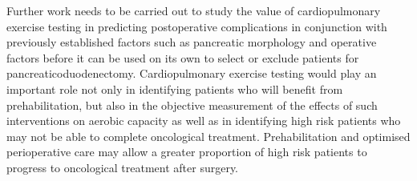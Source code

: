 Further work needs to be carried out to study the value of cardiopulmonary exercise testing in predicting postoperative complications in conjunction with previously established factors such as pancreatic morphology and operative factors before it can be used on its own to select or exclude patients for pancreaticoduodenectomy. 
Cardiopulmonary exercise testing would play an important role not only in identifying patients who will benefit from prehabilitation, but also in the objective measurement of the effects of such interventions on aerobic capacity as well as in identifying high risk patients who may not be able to complete oncological treatment. 
Prehabilitation and optimised perioperative care may allow a greater proportion of high risk patients to progress to oncological treatment after surgery.